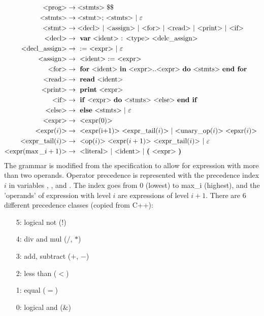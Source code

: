 \documentclass[a4paper]{article}
\begin{document}
\begin{align*}
  \text{$<$prog$>$} &\rightarrow \text{$<$stmts$>$ \$\$} \\
  \text{$<$stmts$>$} &\rightarrow \text{$<$stmt$>$; $<$stmts$>$ $\mid$ $\varepsilon$} \\
  \text{$<$stmt$>$} &\rightarrow \text{$<$decl$>$ $\mid$ 
                 $<$assign$>$ $\mid$
                 $<$for$>$ $\mid$ 
                 $<$read$>$ $\mid$ 
                 $<$print$>$ $\mid$ 
                 $<$if$>$ } \\
  \text{$<$decl$>$} &\rightarrow \text{
    \textbf{var} $<$ident$>$ : $<$type$>$ $<$delc\_assign$>$
  } \\
  \text{$<$decl\_assign$>$} &\rightarrow \text{
     := $<$expr$>$ $\mid$ $\varepsilon$
  }\\
  \text{$<$assign$>$} &\rightarrow \text{
    $<$ident$>$ := $<$expr$>$
  } \\
  \text{$<$for$>$} &\rightarrow \text{
    \textbf{for} $<$ident$>$ \textbf{in} 
    $<$expr$>$..$<$expr$>$ \textbf{do} $<$stmts$>$ 
    \textbf{end for}
  } \\
  \text{$<$read$>$} &\rightarrow \text{
    \textbf{read} $<$ident$>$
  } \\
  \text{$<$print$>$} &\rightarrow \text{
    \textbf{print} $<$expr$>$
  } \\ 
  \text{$<$if$>$} &\rightarrow \text{
    \textbf{if} $<$expr$>$ \textbf{do} $<$stmts$>$
    $<$else$>$ \textbf{end if}
  } \\
  \text{$<$else$>$} &\rightarrow \text{
    \textbf{else} $<$stmts$>$ $\mid$ $\varepsilon$
  } \\
  \text{$<$expr$>$} &\rightarrow \text{ $<$expr($0$)$>$ }\\
  \text{$<$expr($i$)$>$} &\rightarrow \text{ 
    $<$expr(i+1)$>$ $<$expr$\_$tail($i$)$>$ 
    $\mid$ $<$unary$\_$op($i$)$>$ $<$epxr($i$)$>$
  } \\
  \text{$<$expr$\_$tail($i$)$>$} &\rightarrow \text{
    $<$op($i$)$>$ $<$expr($i+1$)$>$ $<$expr$\_$tail($i$)$>$ $\mid$ $\varepsilon$
  } \\
  \text{$<$expr($\max\_i+1$)$>$} &\rightarrow \text{
    $<$literal$>$ $\mid$ $<$ident$>$ 
    $\mid$ \textbf{(} $<$expr$>$ \textbf{)}
  } \\
\end{align*}
The grammar is modified from the specification to allow 
for expression with more than two operands. Operator 
precedence is represented with the precedence index $i$ in 
variables  , ,
 and . The index goes 
from $0$ (lowest) to max\_i (highest), and the 'operands' 
of expression with level $i$ are expressions of level $i+1$.
There are 6 different precedence classes (copied from C++):
\begin{itemize}
  \item[5:] logical not ($!$)
  \item[4:] div and mul ($/$, $*$)
  \item[3:] add, subtract ($+$, $-$)
  \item[2:] less than ($<$)
  \item[1:] equal ($=$)
  \item[0:] logical and ($\&$)
\end{itemize}
\end{document}
